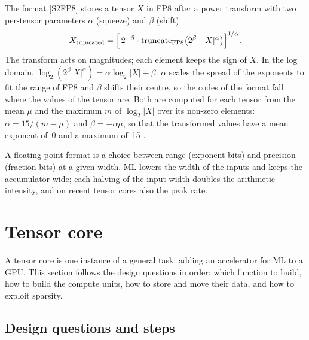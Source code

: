 \documentclass[../main.tex]{subfiles}
\begin{document}
\begin{definition}[S2FP8]
  The format [S2FP8]
  \cite{cambier2020s2fp8} stores a tensor $X$ in FP8 after a power
  transform with two per-tensor parameters $\alpha$ (squeeze) and $\beta$
  (shift):
  \begin{equation}
    X_{\text{truncated}} =
    \Bigl[\, 2^{-\beta} \cdot
      \mathrm{truncate}_{\text{FP8}}\bigl(2^{\beta} \cdot |X|^{\alpha}\bigr)
    \Bigr]^{1/\alpha} .
    \label{eq:l12-s2fp8}
  \end{equation}
  The transform acts on magnitudes; each element keeps the sign of $X$.
  In the log domain, $\log_2 (2^{\beta} |X|^{\alpha}) = \alpha \log_2 |X|
  + \beta$: $\alpha$ scales the spread of the exponents to fit the range
  of FP8 and $\beta$ shifts their centre, so the codes of the format fall
  where the values of the tensor are.  Both are computed for each tensor
  from the mean $\mu$ and the maximum $m$ of $\log_2 |X|$ over its
  non-zero elements: $\alpha = 15/(m - \mu)$ and $\beta = -\alpha\mu$, so
  that the transformed values have a mean exponent of~0 and a maximum
  of~15 \cite[§3.2]{cambier2020s2fp8}.
\end{definition}

\begin{keypoint}
  A floating-point format is a choice between range (exponent bits) and
  precision (fraction bits) at a given width.  ML lowers the width of
  the inputs and keeps the accumulator wide; each halving of the input
  width doubles the arithmetic intensity, and on recent tensor cores
  also the peak rate.
\end{keypoint}

\section{Tensor core}
\label{sec:l12-tensor-core}

A tensor core is one instance of a general task: adding an accelerator
for ML to a GPU.
This section follows the design questions in order: which function to
build, how to build the compute units, how to store and move their
data, and how to exploit sparsity.

\subsection{Design questions and steps}
\end{document}
